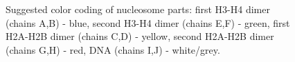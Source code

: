 \documentclass[12pt,onecolumn]{scrartcl}
\begin{document}
\begin{figure}[h]
\begin{center}
\caption{Suggested color coding of nucleosome parts: first H3-H4 dimer (chains A,B) - blue, second H3-H4 dimer (chains E,F) - green, first H2A-H2B dimer (chains C,D) - yellow, second H2A-H2B dimer (chains G,H) - red, DNA (chains I,J) - white/grey.}
\label{colorcode}
\end{center}
\end{figure}
\end{document}
